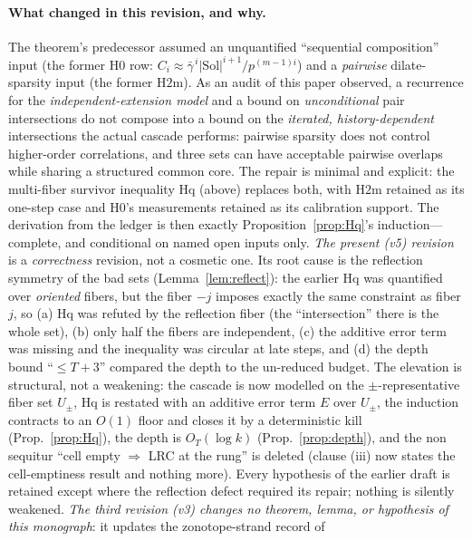 \paragraph{What changed in this revision, and why.}
The theorem's predecessor assumed an unquantified ``sequential
composition'' input (the former $\mathrm{H0}$ row: $C_i\approx
\bar\gamma^{\,i}|\mathrm{Sol}|^{i+1}/p^{(m-1)i}$) and a \emph{pairwise}
dilate-sparsity input (the former $\mathrm{H2m}$). As an audit of this
paper observed, a recurrence for the \emph{independent-extension model}
and a bound on \emph{unconditional} pair intersections do not compose
into a bound on the \emph{iterated, history-dependent} intersections the
actual cascade performs: pairwise sparsity does not control
higher-order correlations, and three sets can have acceptable pairwise
overlaps while sharing a structured common core. The repair is minimal
and explicit: the multi-fiber survivor inequality $\mathrm{Hq}$ (above)
replaces both, with $\mathrm{H2m}$ retained as its one-step case and
$\mathrm{H0}$'s measurements retained as its calibration support. The
derivation from the ledger is then exactly
Proposition~\ref{prop:Hq}'s induction---complete, and conditional on
named open inputs only.
\emph{The present (v5) revision} is a \emph{correctness} revision, not a
cosmetic one. Its root cause is the reflection symmetry of the bad sets
(Lemma~\ref{lem:reflect}): the earlier Hq was quantified over \emph{oriented}
fibers, but the fiber $-j$ imposes exactly the same constraint as fiber $j$,
so (a) Hq was refuted by the reflection fiber (the ``intersection'' there is
the whole set), (b) only half the fibers are independent, (c) the additive
error term was missing and the inequality was circular at late steps, and
(d) the depth bound ``$\le T+3$'' compared the depth to the un-reduced
budget. The elevation is structural, not a weakening: the cascade is now
modelled on the $\pm$-representative fiber set $U_\pm$, Hq is restated with
an additive error term $E$ over $U_\pm$, the induction contracts to an $O(1)$
floor and closes it by a deterministic kill (Prop.~\ref{prop:Hq}), the depth
is $O_T(\log k)$ (Prop.~\ref{prop:depth}), and the non sequitur
``cell empty $\Rightarrow$ LRC at the rung'' is deleted (clause (iii) now
states the cell-emptiness result and nothing more). Every hypothesis of the
earlier draft is retained except where the reflection defect required its
repair; nothing is silently weakened.
\emph{The third revision (v3) changes no theorem, lemma, or hypothesis
of this monograph}: it updates the zonotope-strand record of
